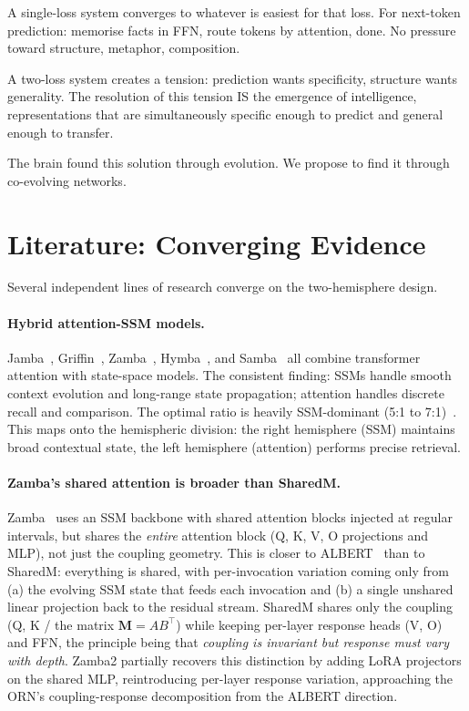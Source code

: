 \documentclass[11pt, a4paper]{article}
\newcommand{\M}{\mathbf{M}}
\theoremstyle{plain}
\theoremstyle{definition}
\theoremstyle{remark}
\begin{document}
A single-loss system converges to whatever is easiest for that loss.
For next-token prediction: memorise facts in FFN, route tokens by attention, done.
No pressure toward structure, metaphor, composition.

A two-loss system creates a tension: prediction wants specificity, structure wants generality.
The resolution of this tension IS the emergence of intelligence, representations that are simultaneously specific enough to predict and general enough to transfer.

The brain found this solution through evolution.
We propose to find it through co-evolving networks.


\section{Literature: Converging Evidence}

Several independent lines of research converge on the two-hemisphere design.

\paragraph{Hybrid attention-SSM models.}
Jamba~\cite{lieber2024jamba}, Griffin~\cite{de2024griffin}, Zamba~\cite{glorioso2024zamba}, Hymba~\cite{nvidia2024hymba}, and Samba~\cite{microsoft2024samba} all combine transformer attention with state-space models.
The consistent finding: SSMs handle smooth context evolution and long-range state propagation; attention handles discrete recall and comparison.
The optimal ratio is heavily SSM-dominant (5:1 to 7:1)~\cite{lieber2024jamba}.
This maps onto the hemispheric division: the right hemisphere (SSM) maintains broad contextual state, the left hemisphere (attention) performs precise retrieval.

\paragraph{Zamba's shared attention is broader than SharedM.}
Zamba~\cite{glorioso2024zamba} uses an SSM backbone with shared attention blocks injected at regular intervals, but shares the \emph{entire} attention block (Q, K, V, O projections and MLP), not just the coupling geometry.
This is closer to ALBERT~\cite{lan2020albert} than to SharedM: everything is shared, with per-invocation variation coming only from (a) the evolving SSM state that feeds each invocation and (b) a single unshared linear projection back to the residual stream.
SharedM shares only the coupling (Q, K / the matrix $\M = AB^\top$) while keeping per-layer response heads (V, O) and FFN, the principle being that \emph{coupling is invariant but response must vary with depth}.
Zamba2 partially recovers this distinction by adding LoRA projectors on the shared MLP, reintroducing per-layer response variation, approaching the ORN's coupling-response decomposition from the ALBERT direction.
\end{document}
